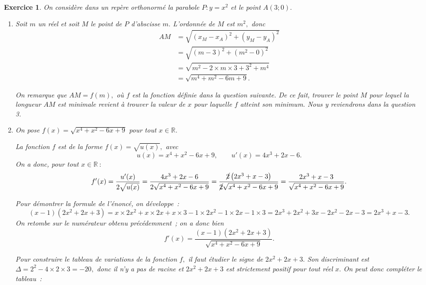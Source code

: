 \documentclass[10pt]{article}
\newtheorem{exo}{Exercice}
\begin{document}
\begin{exo}

On considère dans un repère orthonormé la parabole $P:y=x^2$ et le point $A(3;0).$


\begin{enumerate}
\item Soit $m$ un réel et soit $M$ le point de $P$ d'abscisse $m.$ L'ordonnée de $M$ est $m^2,$ donc 
\begin{align*}AM&=\sqrt{\left(x_M-x_A\right)^2+\left(y_M-y_A\right)^2}
\\&=\sqrt{\left(m-3\right)^2+\left(m^2-0\right)^2}
\\&=\sqrt{m^2-2\times m\times 3+3^2+m^4}
\\&=\sqrt{m^4+m^2-6m+9}.
\end{align*}

\medskip

On remarque que $AM=f(m),$ où $f$ est la fonction définie dans la question suivante. De ce fait, trouver le point $M$ pour lequel la longueur $AM$ est minimale revient à trouver la valeur de $x$ pour laquelle $f$ atteint son minimum. Nous y reviendrons dans la question 3.
\item On pose $f(x)=\sqrt{x^4+x^2-6x+9}$ pour tout $x\in\mathbb{R}.$


La fonction $f$ est de la forme $f(x)=\sqrt{u(x)},$ avec  \[u(x)=x^4+x^2-6x+9,\qquad u'(x)=4x^3+2x-6.\]
 On a donc, pour tout $x\in\mathbb{R}~:$ \[f'(x)=\dfrac{u'(x)}{2\sqrt{u(x)}}=\dfrac{4x^3+2x-6}{2\sqrt{x^4+x^2-6x+9}}=\dfrac{\cancel{2}\left(2x^3+x-3\right)}{\cancel{2}\sqrt{x^4+x^2-6x+9}}=\dfrac{2x^3+x-3}{\sqrt{x^4+x^2-6x+9}}.\]


\medskip

Pour démontrer la formule de l'énoncé, on développe~:
\[(x-1)\left(2x^2+2x+3\right)=x\times 2x^2+x\times 2x+x\times 3-1\times 2x^2-1\times 2x-1\times 3=2x^3+2x^2+3x-2x^2-2x-3=2x^3+x-3.\]
On retombe sur le numérateur obtenu précédemment~; on a donc bien
\[f'(x)=\dfrac{(x-1)\left(2x^2+2x+3\right)}{\sqrt{x^4+x^2-6x+9}}.\]

Pour construire le tableau de variations de la fonction $f,$ il faut étudier le signe de $2x^2+2x+3.$ Son discriminant est $\Delta=2^2-4\times 2\times 3=-20,$ donc il n'y a pas de racine et $2x^2+2x+3$ est strictement positif pour tout réel $x.$ On peut donc compléter le tableau~:

\medskip

\begin{center}
\end{center}


\end{enumerate}
\end{exo}
\end{document}
